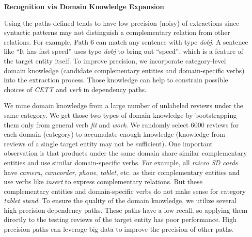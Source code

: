 \textbf{Recognition via Domain Knowledge Expansion}
\label{sec:b}

Using the paths defined tends to have low precision (noisy) of extractions since syntactic patterns may not distinguish a complementary relation from other relations. For example, Path 6 can match any sentence with type \textit{dobj}. A sentence like ``It has fast speed'' uses type \textit{dobj} to bring out ``speed'', which is a feature of the target entity itself. To improve precision, we incorporate category-level domain knowledge (candidate complementary entities and domain-specific verbs) into the extraction process. Those knowledge can help to constrain possible choices of \textit{CETT} and \textit{verb} in dependency paths. 

We mine domain knowledge from a large number of unlabeled reviews under the same category. We get those two types of domain knowledge by bootstrapping them only from general verb \textit{fit} and \textit{work}. We randomly select 6000 reviews for each domain (category) to accumulate enough knowledge (knowledge from reviews of a single target entity may not be sufficient). One important observation is that products under the same domain share similar complementary entities and use similar domain-specific verbs. For example, all \textit{micro SD cards} have \textit{camera}, \textit{camcorder}, \textit{phone}, \textit{tablet}, etc. as their complementary entities and use verbs like \textit{insert} to express complementary relations. But these complementary entities and domain-specific verbs do not make sense for category \textit{tablet stand}. To ensure the quality of the domain knowledge, we utilize several high precision dependency paths. These paths have a low recall, so applying them directly to the testing reviews of the target entity has poor performance. High precision paths can leverage big data to improve the precision of other paths.

\begin{table}
\centering
{}
\caption{Summary of dependency paths for extraction}
\label{chap6:table:bigdatarule}
\end{table}

